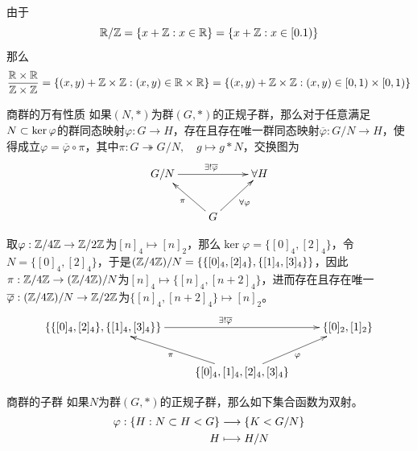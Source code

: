 \begin{solution}
	由于
	$$
	\mathbb{R}/\mathbb{Z}=\{ x+\mathbb{Z}:x\in\mathbb{R} \}=\{ x+\mathbb{Z}:x\in[0.1) \}
	$$
	那么
	$$
	\frac{\mathbb{R}\times \mathbb{R}}{\mathbb{Z}\times\mathbb{Z}}
	=\{ (x,y)+\mathbb{Z}\times\mathbb{Z}:(x,y)\in\mathbb{R}\times\mathbb{R} \}
	=\{ (x,y)+\mathbb{Z}\times\mathbb{Z}:(x,y)\in[0,1)\times[0,1) \}
	$$
\end{solution}

\begin{theorem}{商群的万有性质}
	如果$(N,*)$为群$(G,*)$的正规子群，那么对于任意满足$N\subset\ker\varphi$的群同态映射$\varphi:G\to H$，存在且存在唯一群同态映射$\overline{\varphi}:G/N\to H$，使得成立$\varphi=\overline{\varphi}\circ\pi$，其中$\pi:G\twoheadrightarrow G/N,\quad g\mapsto g*N$，交换图为
	$$
	\xymatrix{
		G/N \ar^{\exists!\overline{\varphi}}[rr]& &\forall H\\
		& G \ar[ul]^{\pi} \ar[ur]_{\forall\varphi} &
	}
	$$
\end{theorem}

\begin{problem}
	取$\varphi:\mathbb{Z}/4\mathbb{Z}\to\mathbb{Z}/2\mathbb{Z}$为$[n]_4\mapsto[n]_2$，那么$\ker\varphi=\{ [0]_4,[2]_4 \}$，令$N=\{ [0]_4,[2]_4 \}$，于是$(\mathbb{Z}/4\mathbb{Z})/N=\{ \{ [0]_4,[2]_4 \},\{ [1]_4,[3]_4 \} \}$，因此$\pi:\mathbb{Z}/4\mathbb{Z}\to (\mathbb{Z}/4\mathbb{Z})/N$为$[n]_4\mapsto\{ [n]_4,[n+2]_4 \}$，进而存在且存在唯一$\overline{\varphi}:(\mathbb{Z}/4\mathbb{Z})/N\to\mathbb{Z}/2\mathbb{Z}$为$\{ [n]_4,[n+2]_4 \}\mapsto [n]_2$。
	$$
	\xymatrix{
		\{ \{ [0]_4,[2]_4 \},\{ [1]_4,[3]_4 \} \} \ar^{\exists!\overline{\varphi}}[rr]& & \{ [0]_2,[1]_2 \}\\
		& \{ [0]_4,[1]_4,[2]_4,[3]_4 \} \ar[ul]^{\pi} \ar[ur]_{\varphi} &
	}
	$$
\end{problem}

\begin{proposition}{商群的子群}
	如果$N$为群$(G,*)$的正规子群，那么如下集合函数为双射。
	\begin{align*}
		\varphi:\begin{aligned}[t]
			\{ H:N\subset H < G \}&\longrightarrow \{ K< G/N \}\\
			H&\longmapsto H/N
		\end{aligned}
	\end{align*}
\end{proposition}

